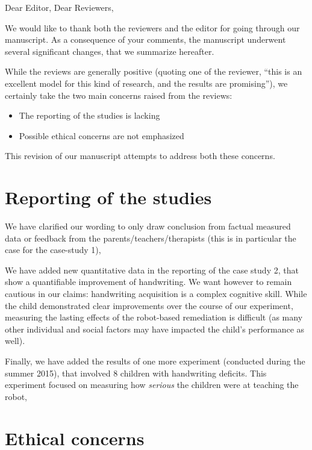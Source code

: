 \documentclass{article}
\begin{document}
Dear Editor, Dear Reviewers,

\vspace{2em}

We would like to thank both the reviewers and the editor for going through our
manuscript. As a consequence of your comments, the manuscript underwent
several significant changes, that we summarize hereafter.

While the reviews are generally positive (quoting one of the reviewer, ``this
is an excellent model for this kind of research, and the results are
promising''), we certainly take the two main concerns raised from the reviews:

\begin{itemize}
    \item The reporting of the studies is lacking
    \item Possible ethical concerns are not emphasized
\end{itemize}

This revision of our manuscript attempts to address both these concerns.

\section*{Reporting of the studies}

We have clarified our wording to only draw conclusion from factual measured
data or feedback from the parents/teachers/therapists (this is in particular
the case for the case-study 1),

We have added new quantitative data in the reporting of the case study 2, that
show a quantifiable improvement of handwriting. We want however to remain
cautious in our claims: handwriting acquisition is a complex cognitive skill.
While the child demonstrated clear improvements over the course of our
experiment, measuring the lasting effects of the robot-based remediation is
difficult (as many other individual and social factors may have impacted the
child's performance as well).

Finally, we have added the results of one more experiment (conducted during the
summer 2015), that involved 8 children with handwriting deficits. This
experiment focused on measuring how \emph{serious} the children were at
teaching the robot,

\section*{Ethical concerns}
\end{document}
